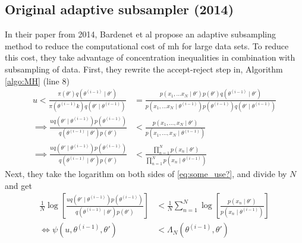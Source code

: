 \documentclass{article}
\theoremstyle{definition}
\begin{document}
\subsection{Original adaptive subsampler (2014)}
In their paper from 2014, Bardenet et al \cite{Bardenet:2} propose an adaptive subsampling method to reduce the computational cost of \gls{mh} for large data sets.  
To reduce this cost, they take advantage of concentration inequalities in combination with subsampling of data. 
First, they rewrite the accept-reject step in, Algorithm \ref{algo:MH}  (line 8)  
\begin{equation}\label{eq:some_use?}
\begin{split}
    u < \frac{\pi\left(\theta'\right)q\left(\theta^{(i-1)}\mid \theta'\right)}{\pi \left(\theta^{(i-1)}k\right)q\left(\theta'\mid \theta^{(i-1)}\right)} &= \frac{p\left(x_1, \ldots x_N \mid \theta'\right) p\left(\theta'\right)q\left(\theta^{(i-1)}\mid \theta'\right)}{p\left(x_1, \ldots x_N\mid \theta^{(i-1)}\right)p\left(\theta^{(i-1)}\right)q\left(\theta'\mid\theta^{(i-1)}\right)} \\ 
    \implies \frac{u q\left(\theta'\mid \theta^{(i-1)} \right)p\left(\theta^{(i-1)}\right)}{q\left(\theta^{(i-1)}\mid\theta'\right)p\left(\theta'\right)} &< \frac{p\left(x_1, \ldots, x_N \mid \theta'\right)}{p\left(x_1, \ldots, x_N \mid \theta^{(i-1)}\right)} \\
    \implies \frac{u q\left(\theta'\mid \theta^{(i-1)} \right) p\left(\theta^{(i-1)}\right)}{q\left(\theta^{(i-1)} \mid \theta'\right) p \left(\theta'\right)} &< \frac{\prod_{n = 1}^N p\left(x_n\mid \theta'\right)}{\prod_{n = 1}^N p\left(x_n \mid \theta^{(i-1)}\right)}
    \end{split}
\end{equation}
Next, they take the logarithm on both sides of \ref{eq:some_use?}, and divide by $N$ and get
\begin{equation}\label{eq:psi_lambda}
\begin{split}
     \frac{1}{N} \log \left[\frac{u q\left(\theta' \mid \theta^{\left(i-1\right)}\right)p\left(\theta^{\left(i-1\right)}\right)}{q\left(\theta^{\left(i-1\right)}\mid \theta'\right)p\left(\theta'\right)}\right] &< \frac{1}{N} \sum_{n = 1}^N \log \left[\frac{p\left(x_n\mid \theta'\right)}{p\left(x_n \mid \theta^{(i-1)}\right)}\right] \\
     \iff  \psi\left(u, \theta^{(i-1)}, \theta'\right) &< \Lambda_N\left(\theta^{(i-1)},\theta'\right) 
\end{split}
\end{equation}
\end{document}
